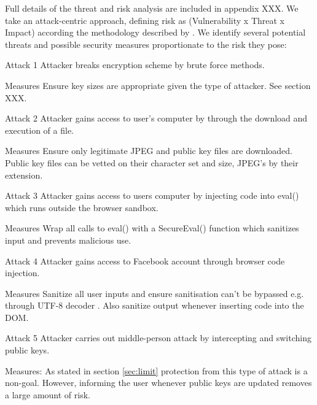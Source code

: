 Full details of the threat and risk analysis are included in appendix XXX. We take an attack-centric approach, defining risk as (Vulnerability x Threat x Impact) according the methodology described by \cite{XXX}. We identify several potential threats and possible security measures proportionate to the risk they pose:


\begin{sdesc} \addtolength{\itemsep}{-0.5\baselineskip}
    \item[Attack 1] Attacker breaks encryption scheme by brute force methods.
    \item[Measures] Ensure key sizes are appropriate given the type of attacker. See section XXX.
\end{sdesc}

\begin{sdesc} \addtolength{\itemsep}{-0.5\baselineskip}
    \item[Attack 2] Attacker gains access to user's computer by through the download and execution of a file.
    \item[Measures] Ensure only legitimate JPEG and public key files are downloaded. Public key files can be vetted on their character set and size, JPEG's by their extension.
\end{sdesc}

\begin{sdesc} \addtolength{\itemsep}{-0.5\baselineskip}
    \item[Attack 3] Attacker gains access to users computer by injecting code into eval() which runs outside the browser sandbox.
    \item[Measures] Wrap all calls to eval() with a SecureEval() function which sanitizes input and prevents malicious use. 
\end{sdesc}

\begin{sdesc} \addtolength{\itemsep}{-0.5\baselineskip}
    \item[Attack 4] Attacker gains access to Facebook account through browser code injection.
    \item[Measures] Sanitize all user inputs and ensure sanitisation can't be bypassed e.g. through UTF-8 decoder \cite{XXX}. Also sanitize output whenever inserting code into the DOM.
\end{sdesc}

\begin{sdesc}\addtolength{\itemsep}{-0.5\baselineskip}
    \item[Attack 5] Attacker carries out middle-person attack by intercepting and switching public keys.
    \item[Measures:] As stated in section \ref{sec:limit} protection from this type of attack is a non-goal. However, informing the user whenever public keys are updated removes a large amount of risk.
\end{sdesc}

